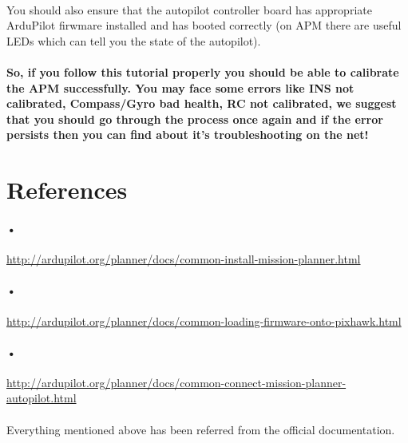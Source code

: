 \documentclass[11pt,a4paper]{article}
\begin{document}
	\paragraph{}You should also ensure that the autopilot controller board has appropriate ArduPilot firwmare installed and has booted correctly (on APM there are useful LEDs which can tell you the state of the autopilot).
	
	\paragraph{So, if you follow this tutorial properly you should be able to calibrate the APM successfully. You may face some errors like INS not calibrated, Compass/Gyro bad health, RC not calibrated, we suggest that you should go through the process once again and if the error persists then you can find about it's troubleshooting on the net!}
	\section{References}
	\paragraph{•}
	\url{http://ardupilot.org/planner/docs/common-install-mission-planner.html}
	\paragraph{•}\url{http://ardupilot.org/planner/docs/common-loading-firmware-onto-pixhawk.html}
	\paragraph{•}\url{http://ardupilot.org/planner/docs/common-connect-mission-planner-autopilot.html}
	\paragraph{}Everything mentioned above has been referred from the official documentation.
	
\end{document}
